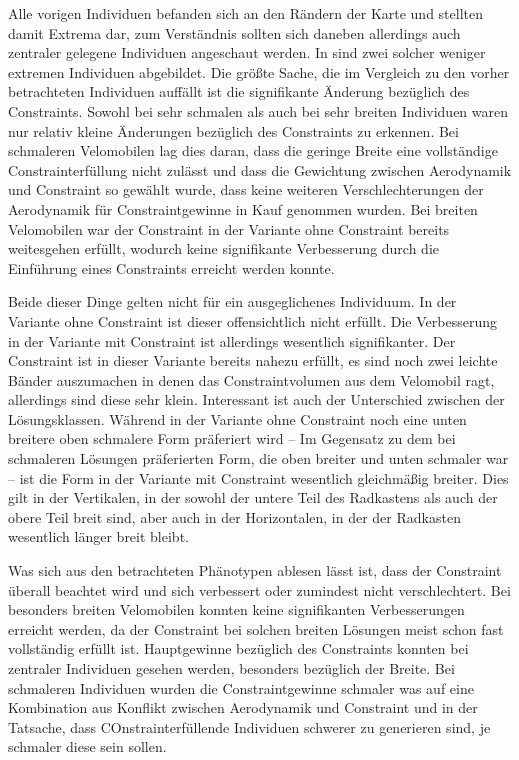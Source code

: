 





Alle vorigen Individuen befanden sich an den Rändern der Karte und stellten damit Extrema dar, zum Verständnis sollten sich daneben allerdings auch zentraler gelegene Individuen angeschaut werden.
In  sind zwei solcher weniger extremen Individuen abgebildet.
Die größte Sache, die im Vergleich zu den vorher betrachteten Individuen auffällt ist die signifikante Änderung bezüglich des Constraints.
Sowohl bei sehr schmalen als auch bei sehr breiten Individuen waren nur relativ kleine Änderungen bezüglich des Constraints zu erkennen.
Bei schmaleren Velomobilen lag dies daran, dass die geringe Breite eine vollständige Constrainterfüllung nicht zulässt und dass die Gewichtung zwischen Aerodynamik und Constraint so gewählt wurde, dass keine weiteren Verschlechterungen der Aerodynamik für Constraintgewinne in Kauf genommen wurden.
Bei breiten Velomobilen war der Constraint in der Variante ohne Constraint bereits weitesgehen erfüllt, wodurch keine signifikante Verbesserung durch die Einführung eines Constraints erreicht werden konnte.

Beide dieser Dinge gelten nicht für ein ausgeglichenes Individuum.
In der Variante ohne Constraint ist dieser offensichtlich nicht erfüllt.
Die Verbesserung in der Variante mit Constraint ist allerdings wesentlich signifikanter.
Der Constraint ist in dieser Variante bereits nahezu erfüllt, es sind noch zwei leichte Bänder auszumachen in denen das Constraintvolumen aus dem Velomobil ragt, allerdings sind diese sehr klein.
Interessant ist auch der Unterschied zwischen der Lösungsklassen.
Während in der Variante ohne Constraint noch eine unten breitere oben schmalere Form präferiert wird -- Im Gegensatz zu dem bei schmaleren Lösungen präferierten Form, die oben breiter und unten schmaler war -- ist die Form in der Variante mit Constraint wesentlich gleichmäßig breiter.
Dies gilt in der Vertikalen, in der sowohl der untere Teil des Radkastens als auch der obere Teil breit sind, aber auch in der Horizontalen, in der der Radkasten wesentlich länger breit bleibt.

Was sich aus den betrachteten Phänotypen ablesen lässt ist, dass der Constraint überall beachtet wird und sich verbessert oder zumindest nicht verschlechtert.
Bei besonders breiten Velomobilen konnten keine signifikanten Verbesserungen erreicht werden, da der Constraint bei solchen breiten Lösungen meist schon fast vollständig erfüllt ist.
Hauptgewinne bezüglich des Constraints konnten bei zentraler Individuen gesehen werden, besonders bezüglich der Breite.
Bei schmaleren Individuen wurden die Constraintgewinne schmaler was auf eine Kombination aus Konflikt zwischen Aerodynamik und Constraint und in der Tatsache, dass COnstrainterfüllende Individuen schwerer zu generieren sind, je schmaler diese sein sollen.



